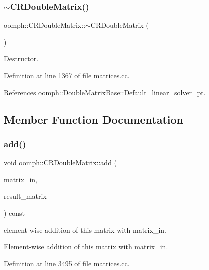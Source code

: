 \subsubsection{\texorpdfstring{$\sim$\+C\+R\+Double\+Matrix()}{~CRDoubleMatrix()}}
{\footnotesize\ttfamily oomph\+::\+C\+R\+Double\+Matrix\+::$\sim$\+C\+R\+Double\+Matrix (\begin{DoxyParamCaption}{ }\end{DoxyParamCaption})\hspace{0.3cm}{\ttfamily [virtual]}}



Destructor. 



Definition at line 1367 of file matrices.\+cc.



References oomph\+::\+Double\+Matrix\+Base\+::\+Default\+\_\+linear\+\_\+solver\+\_\+pt.



\subsection{Member Function Documentation}
\mbox{\label{classoomph_1_1CRDoubleMatrix_a57f88253acfa87a764652c06c1bdc362}} 
\subsubsection{\texorpdfstring{add()}{add()}}
{\footnotesize\ttfamily void oomph\+::\+C\+R\+Double\+Matrix\+::add (\begin{DoxyParamCaption}\item[{const \hyperlink{classoomph_1_1CRDoubleMatrix}{C\+R\+Double\+Matrix} \&}]{matrix\+\_\+in,  }\item[{\hyperlink{classoomph_1_1CRDoubleMatrix}{C\+R\+Double\+Matrix} \&}]{result\+\_\+matrix }\end{DoxyParamCaption}) const}



element-\/wise addition of this matrix with matrix\+\_\+in. 

Element-\/wise addition of this matrix with matrix\+\_\+in. 

Definition at line 3495 of file matrices.\+cc.



